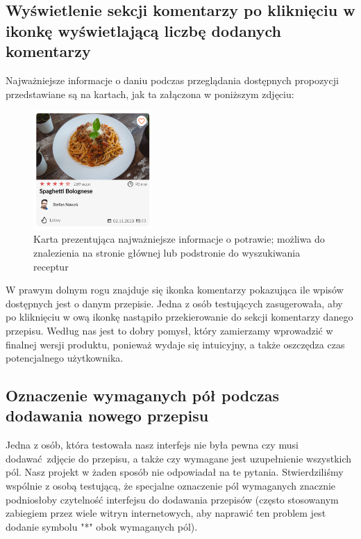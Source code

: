 \documentclass{article}
\begin{document}
\subsection{Wyświetlenie sekcji komentarzy po kliknięciu w ikonkę wyświetlającą liczbę dodanych komentarzy}
Najważniejsze informacje o daniu podczas przeglądania dostępnych propozycji przedstawiane są na kartach, jak ta załączona w poniższym zdjęciu:

\begin{figure}[H]
    \begin{center}
        \includegraphics[width=0.4\textwidth]{images/review-item_1}
    \end{center}
    \caption{Karta prezentująca najważniejsze informacje o potrawie; możliwa do znalezienia na stronie głównej lub podstronie do wyszukiwania receptur}
    \label{fig:food_card}
\end{figure}

W prawym dolnym rogu znajduje się ikonka komentarzy pokazująca ile wpisów dostępnych jest o danym przepisie. Jedna z osób testujących zasugerowała, aby po kliknięciu w ową ikonkę
nastąpiło przekierowanie do sekcji komentarzy danego przepisu. Według nas jest to dobry pomysł, który zamierzamy wprowadzić w finalnej wersji produktu, ponieważ wydaje się
intuicyjny, a także oszczędza czas potencjalnego użytkownika.

\subsection{Oznaczenie wymaganych pół podczas dodawania nowego przepisu}
Jedna z osób, która testowała nasz interfejs nie była pewna czy musi dodawać zdjęcie do przepisu, a także czy wymagane jest uzupełnienie wszystkich pól. Nasz projekt w żaden 
sposób nie odpowiadał na te pytania. Stwierdziliśmy wspólnie z osobą testującą, że specjalne oznaczenie pól wymaganych znacznie podniosłoby czytelność interfejsu do dodawania
przepisów (często stosowanym zabiegiem przez wiele witryn internetowych, aby naprawić ten problem jest dodanie symbolu "*" obok wymaganych pól).
\end{document}
